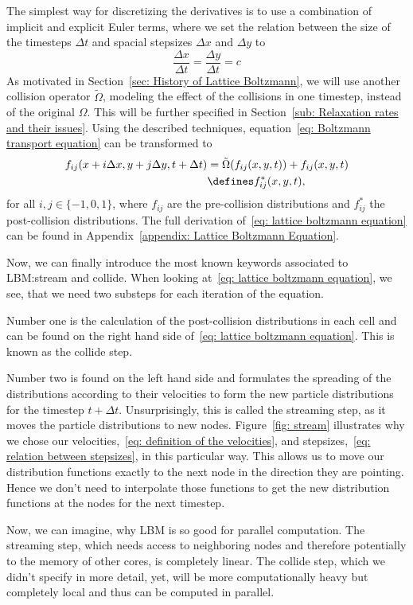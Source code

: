 The simplest way for discretizing the derivatives is to use a combination of implicit and explicit Euler terms, where we set the relation between the size of the timesteps $\Delta t$ and spacial stepsizes $\Delta x$ and $\Delta y$ to
\begin{equation}
  \label{eq: relation between stepsizes}
  \frac{\Delta x} {\Delta{t}} = \frac{\Delta y} {\Delta{t}} = c
\end{equation}
As motivated in Section~\ref{sec: History of Lattice Boltzmann}, we will use another collision operator $\tilde{\Omega}$, modeling the effect of the collisions in one timestep, instead of the original $\Omega$.
This will be further specified in Section~\ref{sub: Relaxation rates and their issues}.
Using the described techniques, equation~\eqref{eq: Boltzmann transport equation} can be transformed to
\begin{equation}
  \label{eq: lattice boltzmann equation}
  \begin{aligned}
    f_{ij}(x + i \Delta x , y + j \Delta y,t + \Delta t)
    &= \tilde{\Omega}(f_{ij}(x,y,t))
    + f_{ij}(x,y,t)
    \\&
    \defines f_{ij}^*(x, y, t),
  \end{aligned}
\end{equation}
for all $i,j\in \{-1, 0, 1\}$, where $f_{ij}$ are the pre-collision distributions and $f_{ij}^*$ the post-collision distributions.
The full derivation of~\eqref{eq: lattice boltzmann equation} can be found in Appendix~\ref{appendix: Lattice Boltzmann Equation}.

Now, we can finally introduce the most known keywords associated to LBM:\@ stream and collide.
When looking at~\eqref{eq: lattice boltzmann equation}, we see, that we need two substeps for each iteration of the equation.

Number one is the calculation of the post-collision distributions in each cell and can be found on the right hand side of~\eqref{eq: lattice boltzmann equation}. This is known as the collide step.

Number two is found on the left hand side and formulates the spreading of the distributions according to their velocities to form the new particle distributions for the timestep $t+\Delta t$.
Unsurprisingly, this is called the streaming step, as it moves the particle distributions to new nodes.
Figure~\ref{fig: stream} illustrates why we chose our velocities,~\eqref{eq: definition of the velocities}, and stepsizes,~\eqref{eq: relation between stepsizes}, in this particular way.
This allows us to move our distribution functions exactly to the next node in the direction they are pointing. Hence we don't need to interpolate those functions to get the new distribution functions at the nodes for the next timestep.

Now, we can imagine, why LBM is so good for parallel computation.
The streaming step, which needs access to neighboring nodes and therefore potentially to the memory of other cores, is completely linear.
The collide step, which we didn't specify in more detail, yet, will be more computationally heavy but completely local and thus can be computed in parallel.
